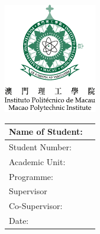 \begin{center}
	\includegraphics[width=0.25\linewidth]{MPI.pdf}
		
	\vspace*{2in}

	\@title
	
	\vfill

	\begin{tabular}{ll}
		Name of Student: & \@author\\
		\midrule
		Student Number: & \StudentNumber\\
		\midrule
		Academic Unit: & \AcademicUnit\\
		\midrule
		Programme: & \Programme\\
		\midrule
		Supervisor & \Cosupervisor\\
		\midrule
		Co-Supervisor: & \Supervisor\\
		\midrule
		Date: & \Date
	\end{tabular}
\end{center}